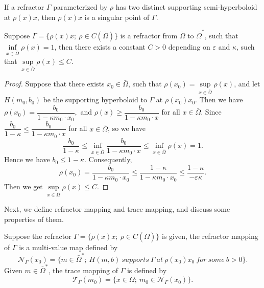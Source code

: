\documentclass[a4paper,12pt,]{article}
\newtheorem{lemma}{\hskip\parindent\bf Lemma}[section]%
\newtheorem{remark}{\hskip\parindent\bf Remark}[section]%
\newtheorem{definition}{\hskip\parindent\bf Definition}[section]%
\numberwithin{equation}{section}
\numberwithin{equation}{section} \allowdisplaybreaks
\begin{document}
\begin{remark}
  If a refractor $\Gamma$ parameterized by $\rho$ has two distinct supporting semi-hyperboloid at $\rho(x)x$, then $\rho(x)x$ is a singular point of $\Gamma$.
  \label{rem3.1}
\end{remark}

\begin{lemma}
  Suppose $\Gamma = \{\rho(x)x ; ~\rho \in C(\bar{\Omega})\}$ is a refractor from $\bar{\Omega}$ to $\bar{\Omega}^{\ast}$, such that $\inf\limits_{x\in \bar{\Omega}}\rho(x) = 1$, then there exists a constant $C>0$ depending on $\varepsilon$ and $\kappa$, such that $\sup\limits_{x\in \bar{\Omega}}\rho(x) \leq C$.
  \label{lem3.2}
\end{lemma}

\begin{proof}
  Suppose that there exists $x_{0} \in \bar{\Omega}$, such that $\rho(x_{0}) = \sup\limits_{x\in \bar{\Omega}}\rho(x)$, and let $H(m_{0},b_{0})$ be the supporting hyperboloid to $\Gamma$ at $\rho(x_{0})x_{0}$. Then we have
    $\rho(x_{0}) = \dfrac{b_{0}}{1 - \kappa m_{0} \cdot x_{0}},$ and $\rho(x) \geq \dfrac{b_{0}}{1 - \kappa m_{0} \cdot x}$ for all $x \in \bar{\Omega}$. Since $\dfrac{b_{0}}{1 - \kappa} \leq \dfrac{b_{0}}{1 - \kappa m_{0} \cdot x}$ for all $x \in \bar{\Omega}$, so we have
    $$\frac{b_{0}}{1 - \kappa} \leq \inf_{x \in \bar{\Omega}}\frac{b_{0}}{1 - \kappa m_{0} \cdot x} \leq \inf_{x \in \bar{\Omega}} \rho(x) = 1.$$
    Hence we have $b_{0} \leq 1 - \kappa$.
    Consequently,
    $$\rho(x_{0}) = \frac{b_{0}}{1 - \kappa m_{0} \cdot x_{0}} \leq \frac{1 - \kappa}{1 - \kappa m_{0} \cdot x_{0}} \leq \frac{1-\kappa}{-\varepsilon \kappa}.$$
    Then we get $\sup\limits_{x\in \bar{\Omega}}\rho(x) \leq C$.
\end{proof}

Next, we define refractor mapping and trace mapping, and discuss some properties of them.

\begin{definition}
  Suppose the refractor $\Gamma = \{\rho(x)x; ~\rho \in C(\bar{\Omega})\}$ is given, the refractor mapping of $\Gamma$ is a multi-value map defined by
  \begin{equation}\label{3.2}
    \mathcal{N}_{\Gamma}(x_{0}) = \{m \in \bar{\Omega}^{\ast};~H(m,b) ~supports~\Gamma ~at ~\rho(x_{0})x_{0} ~ for~some ~b>0 \}.
  \end{equation}
  Given $m \in \bar{\Omega}^{\ast}$, the trace mapping of $\Gamma$ is defined by
  \begin{equation}\label{3.3}
    \mathcal{T}_{\Gamma}(m_{0}) = \{x \in \bar{\Omega};~m_{0}\in \mathcal{N}_{\Gamma}(x_{0})\}.
  \end{equation}
  \label{def3.2}
\end{definition}
\end{document}
